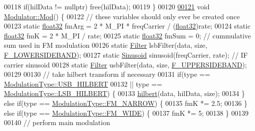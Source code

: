 \begin{DoxyCode}
00118         \textcolor{keywordflow}{if}(hilData != \textcolor{keyword}{nullptr}) free(hilData);
00119     \}
00120 
\hypertarget{Modulator_8hpp_source_l00121}{}\hyperlink{classradio_1_1Modulator_ab5eac6e4900579486b5871b48e64cdab}{00121}     \textcolor{keywordtype}{void} \hyperlink{classradio_1_1Modulator_ab5eac6e4900579486b5871b48e64cdab}{Modulator::Mod}() \{
00122         \textcolor{comment}{// these variables should only ever be created once}
00123         \textcolor{keyword}{static} \hyperlink{definitions_8hpp_aacdc525d6f7bddb3ae95d5c311bd06a1}{float32} fmArg = 2 * M\_PI * freqCarrier / (\hyperlink{definitions_8hpp_aacdc525d6f7bddb3ae95d5c311bd06a1}{float32})rate;
00124         \textcolor{keyword}{static} \hyperlink{definitions_8hpp_aacdc525d6f7bddb3ae95d5c311bd06a1}{float32} fmK = 2 * M\_PI / rate;
00125         \textcolor{keyword}{static} \hyperlink{definitions_8hpp_aacdc525d6f7bddb3ae95d5c311bd06a1}{float32} fmSum = 0;  \textcolor{comment}{// cummulative sum used in FM modulation}
00126         \textcolor{keyword}{static} \hyperlink{classradio_1_1Filter}{Filter} lsbFilter(data, size, \hyperlink{namespaceradio_a0ffd57d5a11ff70a1f55dbdc8ebe098d}{F\_LOWERSIDEBAND});
00127         \textcolor{keyword}{static} \hyperlink{classradio_1_1Sinusoid}{Sinusoid} sinusoid(freqCarrier, rate);  \textcolor{comment}{// IF carrier sinusoid}
00128         \textcolor{keyword}{static} \hyperlink{classradio_1_1Filter}{Filter} usbFilter(data, size, \hyperlink{namespaceradio_a0ec4548711b6d6ed6867c70b3fc2a413}{F\_UPPERSIDEBAND});
00129 
00130         \textcolor{comment}{// take hilbert transform if necessary}
00131         \textcolor{keywordflow}{if}(type == \hyperlink{namespaceradio_a46fb7299001138f28b7f69975c58399ea1b14284e455bf5c311de662665312d13}{ModulationType::USB\_HILBERT}
00132                 || type == \hyperlink{namespaceradio_a46fb7299001138f28b7f69975c58399ea18f970daa5b5a8f72cbd45f7b49a6b6a}{ModulationType::LSB\_HILBERT}) \{
00133             \hyperlink{namespaceradio_a285a47b4ed81e5662d2b6b4bae0188d0}{hilbert}(data, hilData, size);
00134         \} \textcolor{keywordflow}{else} \textcolor{keywordflow}{if}(type == \hyperlink{namespaceradio_a46fb7299001138f28b7f69975c58399ea7b4b1e7876b8d9de5b77b9264fbe556a}{ModulationType::FM\_NARROW}) \{
00135             fmK *= 2.5;
00136         \} \textcolor{keywordflow}{else} \textcolor{keywordflow}{if}(type == \hyperlink{namespaceradio_a46fb7299001138f28b7f69975c58399eafabee3b32b363b14950cb5f5b61e998c}{ModulationType::FM\_WIDE}) \{
00137             fmK *= 5;
00138         \}
00139 
00140         \textcolor{comment}{// perform main modulation}

\end{DoxyCode}
